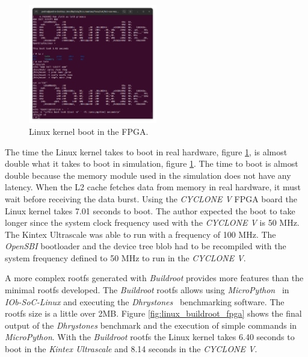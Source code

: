 \begin{figure}[!ht]
    \centering
    \includegraphics[width=0.5\textwidth]{../images/linux_fpga.png}
    \caption{Linux kernel boot in the FPGA.}
    \label{fig:linux_fpga}
\end{figure}

The time the Linux kernel takes to boot in real hardware, figure \ref{fig:linux_fpga}, is almost double what it takes to boot in simulation, figure \ref{fig:linux_fpga}. The time to boot is almost double because the memory module used in the simulation does not have any latency. When the L2 cache fetches data from memory in real hardware, it must wait before receiving the data burst. Using the \textit{CYCLONE V} FPGA board the Linux kernel takes 7.01 seconds to boot. The author expected the boot to take longer since the system clock frequency used with the \textit{CYCLONE V} is 50 MHz. The Kintex Ultrascale was able to run with a frequency of 100 MHz. The \textit{OpenSBI} bootloader and the device tree blob had to be recompiled with the system frequency defined to 50 MHz to run in the \textit{CYCLONE V}.

A more complex rootfs generated with \textit{Buildroot} provides more features than the minimal rootfs developed. The \textit{Buildroot} rootfs allows using \textit{MicroPython}~\cite{tollervey2017programming} in \textit{IOb-SoC-Linux} and executing the \textit{Dhrystones}~\cite{weicker1984dhrystone} benchmarking software. The rootfs size is a little over 2MB. Figure \ref{fig:linux_buildroot_fpga} shows the final output of the \textit{Dhrystones} benchmark and the execution of simple commands in \textit{MicroPython}. With the \textit{Buildroot} rootfs the Linux kernel takes 6.40 seconds to boot in the \textit{Kintex Ultrascale} and 8.14 seconds in the \textit{CYCLONE V}.

